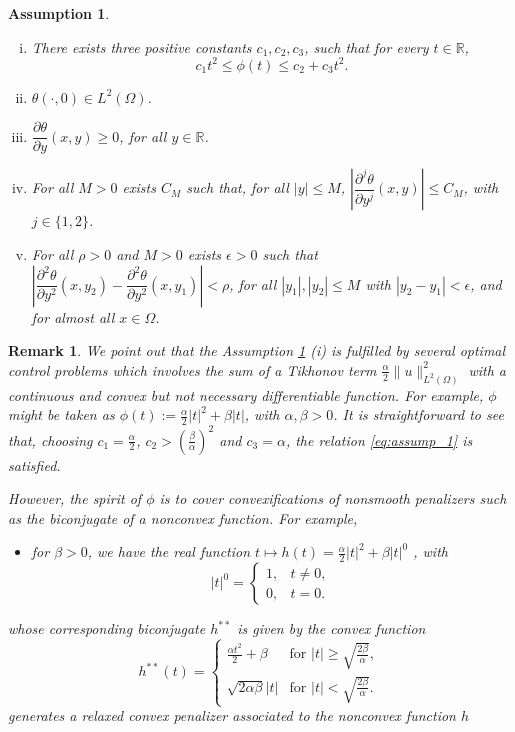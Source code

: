 \documentclass[11pt,a4paper]{amsart}
\renewcommand{\l}{\left}
\renewcommand{\r}{\right}
\newcommand{\om}{\Omega}
\newcommand{\R}{\mathbb{R}}
\newcounter{theassumption}
\newtheorem{assumption}[theassumption]{{Assumption}}
\newtheorem{remark}{{Remark}}
\newcommand{\norm}[1]{\lVert #1 \rVert}
\begin{document}
 \begin{assumption}\label{assu:1}
 ~
     \begin{enumerate}[(i)]
         \item There exists three positive constants $c_1, c_2, c_3$, such that for every $t\in \R$,
        \begin{equation}\label{eq:assump_1}
             c_1t^2\le \phi(t)\le c_2+c_3t^2.
        \end{equation}
        \item $\theta(\cdot,0)\in L^2(\om)$.
        \item $\dfrac{\partial \theta}{\partial y}(x,y)\ge 0$, for all $y\in \R$.
        \item For all $M>0$ exists $C_{M}$ such that, for all $|y|\le M$, $\l|\dfrac{\partial^j\theta}{\partial y^j}(x,y)\r|\le C_{M}$, with $j\in\{1,2\}$.
        \item For all $\rho>0$ and $M>0$ exists $\epsilon>0$ such that $\l|\dfrac{\partial ^2\theta}{\partial y^2}(x,y_2)-\dfrac{\partial ^2\theta}{\partial y^2}(x,y_1)\r|<\rho$, for all $|y_1|, |y_2|\le M$ with $|y_2-y_1|<\epsilon$, and for almost all $x\in \om$.
     \end{enumerate}
 \end{assumption}
\begin{remark}
   We point out that the Assumption \ref{assu:1} (i) is fulfilled by several optimal control problems which involves the sum of a Tikhonov term $\frac{\alpha}{2}\norm{u}_{L^2(\om)}^2$ with a continuous and convex but not necessary differentiable function.  For example,  $\phi$ might be taken as $\phi(t):=\frac{\alpha}{2}|t|^2+\beta|t|$, with $\alpha, \beta>0$. It is straightforward to see that, choosing $c_1=\frac{\alpha}{2}$, $c_2>\l(\frac{\beta}{\alpha}\r)^2$ and $c_3=\alpha$, the relation \eqref{eq:assump_1} is satisfied. 

   However, the spirit of $\phi$ is to cover convexifications of nonsmooth penalizers such as the biconjugate of a nonconvex function. For example,
   \begin{itemize}
       \item for $\beta>0$,  we have the real function $t \mapsto h(t)=\frac{\alpha}{2}|t|^2+\beta|t|^0$ , with  
       $$
       |t|^0=\begin{cases}
      1, &t\ne 0,\\
      0, &t=0.
   \end{cases}
       $$
   \end{itemize}
 whose corresponding biconjugate $h^{**}$ is given by the convex function
\begin{equation} \label{eq:bic_l0}
  h^{**}(t) = 
\begin{cases} 
    \frac{\alpha t^2}{2} + \beta & \text{for } |t| \geq \sqrt{\frac{2\beta}{\alpha}}, \\
    \sqrt{2\alpha \beta} |t| & \text{for } |t| < \sqrt{\frac{2\beta}{\alpha}}.
\end{cases}  
\end{equation}
generates a relaxed convex penalizer associated to the nonconvex function $h$
\end{remark}
\end{document}
